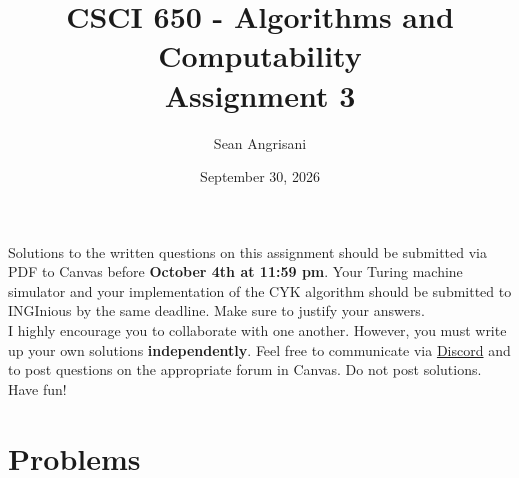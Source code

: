 \documentclass{article}
\title{CSCI 650 - Algorithms and Computability \\ Assignment 3}
\author{ }
\date{}
\author{Sean Angrisani}
\date{September 30, 2026}
\begin{document}
\maketitle


\noindent Solutions to the written questions on this assignment should be submitted via PDF to Canvas before \textbf{October 4th at 11:59 pm}. Your Turing machine simulator and your implementation of the CYK algorithm should be submitted to INGInious by the same deadline. Make sure to justify your answers. \\

\noindent I highly encourage you to collaborate with one another. However, you must write up your own solutions \textbf{independently}. Feel free to communicate via \href{https://discord.gg/xfBWWkbm2P}{Discord} and to post questions on the appropriate forum in Canvas. Do not post solutions.\\

\noindent Have fun!


\section*{Problems}
\end{document}

